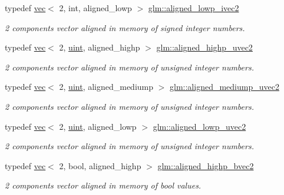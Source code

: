 \begin{DoxyCompactItemize}
typedef \hyperlink{structglm_1_1vec}{vec}$<$ 2, int, aligned\+\_\+lowp $>$ \hyperlink{group__gtc__type__aligned_ga186cb1ada403d7a52411f64c83295486}{glm\+::aligned\+\_\+lowp\+\_\+ivec2}
\begin{DoxyCompactList}\small\item\em 2 components vector aligned in memory of signed integer numbers. \end{DoxyCompactList}\item 
typedef \hyperlink{structglm_1_1vec}{vec}$<$ 2, \hyperlink{group__core__precision_ga4fd29415871152bfb5abd588334147c8}{uint}, aligned\+\_\+highp $>$ \hyperlink{group__gtc__type__aligned_ga4497b2f3be81910c7a1bf632b51ac9a6}{glm\+::aligned\+\_\+highp\+\_\+uvec2}
\begin{DoxyCompactList}\small\item\em 2 components vector aligned in memory of unsigned integer numbers. \end{DoxyCompactList}\item 
typedef \hyperlink{structglm_1_1vec}{vec}$<$ 2, \hyperlink{group__core__precision_ga4fd29415871152bfb5abd588334147c8}{uint}, aligned\+\_\+mediump $>$ \hyperlink{group__gtc__type__aligned_gacb673fdb5622c457d9f8ec669bc32842}{glm\+::aligned\+\_\+mediump\+\_\+uvec2}
\begin{DoxyCompactList}\small\item\em 2 components vector aligned in memory of unsigned integer numbers. \end{DoxyCompactList}\item 
typedef \hyperlink{structglm_1_1vec}{vec}$<$ 2, \hyperlink{group__core__precision_ga4fd29415871152bfb5abd588334147c8}{uint}, aligned\+\_\+lowp $>$ \hyperlink{group__gtc__type__aligned_gabd374d47967c0eefc8b98a405d064cc6}{glm\+::aligned\+\_\+lowp\+\_\+uvec2}
\begin{DoxyCompactList}\small\item\em 2 components vector aligned in memory of unsigned integer numbers. \end{DoxyCompactList}\item 
typedef \hyperlink{structglm_1_1vec}{vec}$<$ 2, bool, aligned\+\_\+highp $>$ \hyperlink{group__gtc__type__aligned_gafa71bded1fc2dd68608207de49a96870}{glm\+::aligned\+\_\+highp\+\_\+bvec2}
\begin{DoxyCompactList}\small\item\em 2 components vector aligned in memory of bool values. \end{DoxyCompactList}\item 

\end{DoxyCompactItemize}
